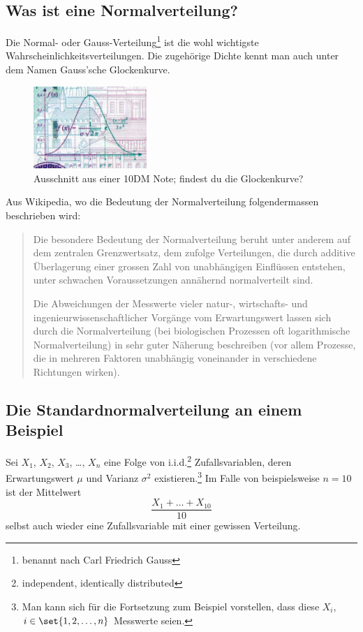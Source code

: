 \documentclass[%
11pt,%
twoside,%
titlepage,%
german,%
headsepline%
]{scrartcl}
\begin{document}
\subsection{Was ist eine Normalverteilung?}

Die Normal- oder Gauss-Verteilung\footnote{benannt nach Carl Friedrich Gauss} ist die wohl wichtigste Wahrscheinlichkeitsverteilungen. Die zugehörige Dichte kennt man auch unter dem Namen Gauss'sche Glockenkurve.

\begin{figure}
    \centering
    \includegraphics[width=0.382\textwidth]{pictures/gauss}
    \caption{Ausschnitt aus einer 10DM Note; findest du die Glockenkurve?}
    \label{fig:glockenkurve}
\end{figure}

Aus Wikipedia, wo die Bedeutung der Normalverteilung folgendermassen beschrieben wird:
\begin{quote}
 Die besondere Bedeutung der Normalverteilung beruht unter anderem auf dem zentralen Grenzwertsatz, dem zufolge Verteilungen, die durch additive Überlagerung einer grossen Zahl von unabhängigen Einflüssen entstehen, unter schwachen Voraussetzungen annähernd normalverteilt sind.
 
 Die Abweichungen der Messwerte vieler natur-, wirtschafts- und ingenieurwissenschaftlicher Vorgänge vom Erwartungswert lassen sich durch die Normalverteilung (bei biologischen Prozessen oft logarithmische Normalverteilung) in sehr guter Näherung beschreiben (vor allem Prozesse, die in mehreren Faktoren unabhängig voneinander in verschiedene Richtungen wirken).
\end{quote}

\subsection{Die Standardnormalverteilung an einem Beispiel}

Sei $X_1$, $X_2$, $X_3$, \dots , $X_n$ eine Folge von i.i.d.\footnote{independent, identically distributed} Zufallsvariablen, deren Erwartungswert $\mu$ und Varianz $\sigma^2$ existieren.\footnote{Man kann sich für die Fortsetzung zum Beispiel vorstellen, dass diese $X_i$, $i\in\set{1,2,\dots,n}$ Messwerte seien.} Im Falle von beispielsweise $n=10$ ist der Mittelwert
$$\frac{X_1+\dots+X_{10}}{10}$$
selbst auch wieder eine Zufallsvariable mit einer gewissen Verteilung.
\end{document}
